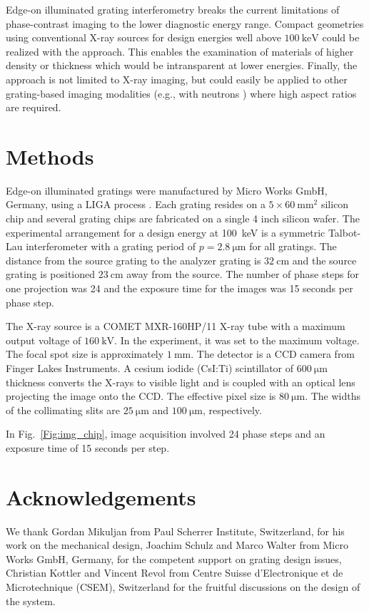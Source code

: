 \documentclass[aip,apl,amsmath,amssymb,floatfix,reprint,a4paper]{revtex4-1}
\begin{document}
Edge-on illuminated grating interferometry breaks the current limitations of
phase-contrast imaging to the lower diagnostic energy range. Compact
geometries  using conventional X-ray sources for design energies well above
$\SI{100}{\kilo\electronvolt}$ could be realized with the approach. This
enables the examination of materials of higher density or thickness which
would be intransparent at lower energies. Finally, the approach is not
limited to X-ray imaging, but could easily be applied to other grating-based
imaging modalities (e.g., with neutrons \cite{Grunzweig2008}) where high
aspect ratios are required.

\section*{Methods}
Edge-on illuminated gratings were manufactured by Micro
Works GmbH, Germany, using a LIGA process \cite{Kenntner2010}. Each grating
resides on a $5 \times \SI{60}{\milli\metre^2}$ silicon chip and several
grating chips are fabricated on a single 4 inch silicon wafer. The
experimental arrangement for a design energy at \SI{100}{\kilo\electronvolt}
is a symmetric Talbot-Lau interferometer with a grating period of $p =
\SI{2.8}{\micro \metre}$ for all gratings. The distance from the source
grating to the analyzer grating is $\SI{32}{\centi\metre}$ and the source
grating is positioned $\SI{23}{\centi\metre}$ away from the source. The
number of phase steps for one projection was 24 \cite{Weitkamp2005} and the
exposure time for the images was 15 seconds per phase step.

The X-ray source is a COMET MXR-160HP/11 X-ray tube with a maximum output
voltage of $\SI{160}{\kilo\volt}$. In the experiment, it was set to the
maximum voltage. The focal spot size is approximately
$\SI{1}{\milli\metre}$. The detector is a CCD camera from Finger Lakes
Instruments. A cesium iodide (CsI:Ti) scintillator of $\SI{600}{\micro
\metre}$ thickness converts the X-rays to visible light and is coupled with
an optical lens projecting the image onto the CCD. The effective pixel size
is $\SI{80}{\micro \metre}$. The widths of the collimating slits are
$\SI{25}{\micro \metre}$ and $\SI{100}{\micro \metre}$, respectively.

In Fig.~\ref{Fig:img_chip}, image acquisition involved 24 phase steps
\cite{Weitkamp2005} and an exposure time of 15 seconds per step.

\section*{Acknowledgements} We thank Gordan Mikuljan from Paul Scherrer
Institute, Switzerland, for his work on the mechanical design, Joachim
Schulz and Marco Walter from Micro Works GmbH, Germany, for the competent
support on grating design issues, Christian Kottler and Vincent Revol from
Centre Suisse d'Electronique et de Microtechnique (CSEM), Switzerland for
the fruitful discussions on the design of the system.

 
\end{document}
